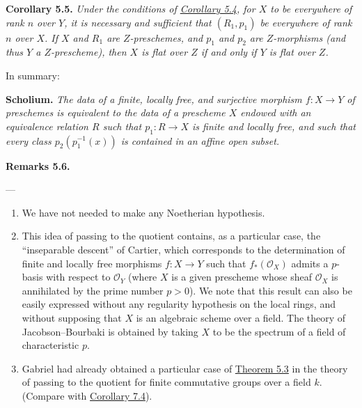 \documentclass{article}
\newenvironment{itenv}[1]
  {\phantomsection\par\smallskip\noindent\textbf{#1.}\itshape}
  {\par\smallskip}
\newenvironment{rmenv}[1]
  {\phantomsection\par\smallskip\noindent\textbf{#1.}\rmfamily}
  {\par\smallskip}
\theoremstyle{definition}
\theoremstyle{definition}
\theoremstyle{definition}
\theoremstyle{definition}
\theoremstyle{remark}
\begin{document}
\leavevmode{}%
\begin{itenv}{Corollary 5.5}
Under the conditions of \protect\hyperlink{fga-3-iii-corollary-5.4}{Corollary 5.4}, for \(X\) to be everywhere of rank \(n\) over \(Y\), it is necessary and sufficient that \((R_1,p_1)\) be everywhere of rank \(n\) over \(X\).
If \(X\) and \(R_1\) are \(Z\)-preschemes, and \(p_1\) and \(p_2\) are \(Z\)-morphisms (and thus \(Y\) a \(Z\)-prescheme), then \(X\) is flat over \(Z\) if and only if \(Y\) is flat over \(Z\).

\end{itenv}

In summary:

\begin{itenv}{Scholium}
The data of a finite, locally free, and surjective morphism \(f\colon X\to Y\) of preschemes is equivalent to the data of a prescheme \(X\) endowed with an equivalence relation \(R\) such that \(p_1\colon R\to X\) is finite and locally free, and such that every class \(p_2(p_1^{-1}(x))\) is contained in an affine open subset.

\end{itenv}

\hypertarget{fga-3-iii-remarks-5.6}{}
\begin{rmenv}{Remarks 5.6}

---

\begin{enumerate}
\def\labelenumi{\arabic{enumi}.}
\item
  We have not needed to make any Noetherian hypothesis.
\item
  This idea of passing to the quotient contains, as a particular case, the ``inseparable descent'' of Cartier, which corresponds to the determination of finite and locally free morphisms \(f\colon X\to Y\) such that \(f_*({\mathcal{O}}_X)\) admits a \(p\)-basis with respect to \({\mathcal{O}}_Y\) (where \(X\) is a given prescheme whose sheaf \({\mathcal{O}}_X\) is annihilated by the prime number \(p>0\)).
  We note that this result can also be easily expressed without any regularity hypothesis on the local rings, and without supposing that \(X\) is an algebraic scheme over a field.
  The theory of Jacobson--Bourbaki is obtained by taking \(X\) to be the spectrum of a field of characteristic \(p\).
\item
  Gabriel had already obtained a particular case of \protect\hyperlink{fga-3-iii-theorem-5.3}{Theorem 5.3} in the theory of passing to the quotient for finite commutative groups over a field \(k\).
  (Compare with \protect\hyperlink{fga-3-iii-corollary-7.4}{Corollary 7.4}).
\end{enumerate}

\end{rmenv}
\end{document}
